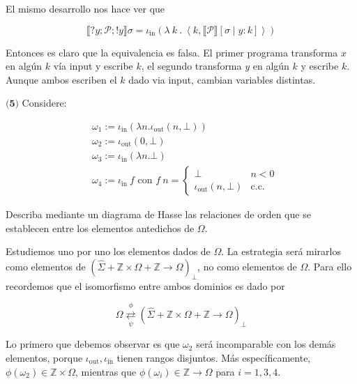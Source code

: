 \documentclass[a4paper, 12pt]{article}
\begin{document}
El mismo desarrollo nos hace ver que 

\begin{equation*}
  \llbracket ?y ; \mathcal{P}; !y \rrbracket\sigma = \iota_{\text{in}}\left(
  \lambda ~ k ~ . ~ \left< k, \llbracket \mathcal{P} \rrbracket[\sigma \mid y : k] \right> \right) 
\end{equation*}

Entonces es claro que la equivalencia es falsa. El primer programa transforma
$x$ en algún $k$ vía input y escribe $k$, el segundo transforma $y$ en algún $k$
y escribe $k$. Aunque ambos escriben el $k$ dado via input, cambian variables
distintas.

\pagebreak 

\begin{myframe}
  
$\textbf{(5)}$ Considere: 

\begin{align*}
  &\omega_1 := \iota_\text{in}\left( \lambda n . \iota_{\text{out}}(n, \bot ) \right)  \\ 
  &\omega_2 := \iota_{\text{out}}(0, \bot ) \\ 
  &\omega_3 := \iota_{\text{in}}(\lambda n. \bot ) \\ 
  &\omega_4 := \iota_{\text{in}} ~ f \text{  con  } f ~ n = \begin{cases}
    \bot  & n < 0 \\ 
    \iota_{\text{out}}(n, \bot ) &\text{c.c.}
  \end{cases}
\end{align*}

Describa mediante un diagrama de Hasse las relaciones de orden que se establecen
entre los elementos antedichos de $\Omega$.

\end{myframe}

Estudiemos uno por uno los elementos dados de 
$\Omega $. La estrategia
será mirarlos como elementos de $\left( \hat{\Sigma}+ \mathbb{Z} \times \Omega +
\mathbb{Z} \to \Omega\right)_\bot$, no como elementos de $\Omega$. Para ello
recordemos que el isomorfismo entre ambos dominios es dado por


\begin{equation*}
  \Omega 
\underset{\psi}{\overset{\phi}{\rightleftarrows}} 
\left( \hat{\Sigma} + \mathbb{Z} \times \Omega + \mathbb{Z} \to \Omega\right)_{\perp}
\end{equation*}


Lo primero que debemos observar es que $\omega_2$ será incomparable
con los demás elementos, porque $\iota_{\text{out}}, \iota_{\text{in}}$ tienen
rangos disjuntos. Más específicamente, $\phi ( \omega_2 ) \in \mathbb{Z} \times \Omega$,
mientras que $\phi(\omega_i) \in \mathbb{Z} \to \Omega$ para $i = 1, 3, 4$.
\end{document}
